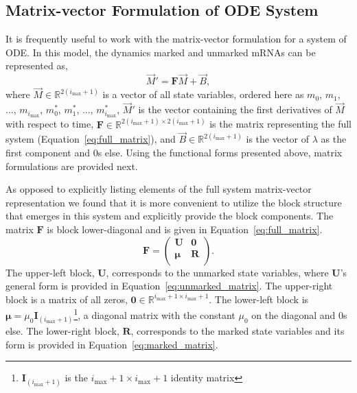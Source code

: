 \documentclass[review]{elsarticle}
\newcommand{\imax}{\ensuremath{i_{\max}}\xspace}
\let\bs\boldsymbol
\begin{document}
\subsection{Matrix-vector Formulation of ODE System}
It is frequently useful to work with the matrix-vector formulation for a system of ODE.
In this model, the dynamics marked and unmarked mRNAs can be represented as,
\begin{equation}\label{eq:matrix_full}\vec{M}'=\boldsymbol{F}\vec{M}+\vec{B},
\end{equation} 
where $\vec{M}\in\mathbb{R}^{2(\imax+1)}$ is a vector of all state variables, ordered here as $m_0$, $m_1$, ..., $m_{\imax}$, $m^*_0$, $m^*_1$, ..., $m^*_{\imax}$, $\vec{M}'$ is the vector containing the first derivatives of $\vec{M}$ with respect to time, $\bs{F}\in\mathbb{R}^{2(\imax+1)\times 2(\imax+1)}$ is the matrix representing the full system (Equation~\ref{eq:full_matrix}), and $\vec{B}\in\mathbb{R}^{2(\imax+1)}$ is the vector of $\lambda$ as the first component and 0s else.
Using the functional forms presented above, matrix formulations are provided next.

As opposed to explicitly listing elements of the full system matrix-vector representation we found that it is more convenient to utilize the block structure that emerges in this system and explicitly provide the block components.
The matrix $\bs{F}$ is block lower-diagonal and is given in Equation~\ref{eq:full_matrix}.
\begin{equation}
\label{eq:full_matrix}
\bs{F}=\left(\begin{array}{cc}
\bs{U} & \bs{0} \\
\bs{\mu} & \bs{R} \\
\end{array} \right).
\end{equation}
The upper-left block, $\bs{U}$, corresponds to the unmarked state variables, where $\bs{U}$'s general form is provided in Equation~\ref{eq:unmarked_matrix}.
The upper-right block is a matrix of all zeros, $\bs{0}\in\mathbb{R}^{\imax+1\times \imax+1}$.
The lower-left block is $\bs{\mu}=\mu_0\bs{I}_{(\imax+1)}$\footnote{$\bs{I}_{(\imax+1)}$ is the $\imax+1\times \imax+1$ identity matrix}, a diagonal matrix with the constant $\mu_0$ on the diagonal and 0s else.
The lower-right block, $\bs{R}$, corresponds to the marked state variables and its form is provided in Equation~\ref{eq:marked_matrix}.
\end{document}
